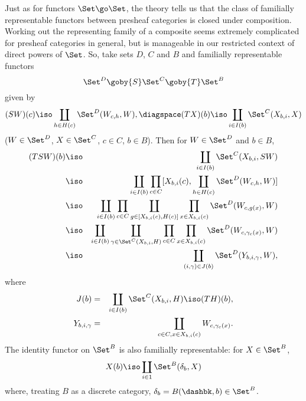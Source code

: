 Just as for functors $\Set \go \Set$, the theory tells us that the class of
familially representable functors between presheaf categories is closed
under composition.  Working out the representing family of a composite
seems extremely complicated for presheaf categories in general, but is
manageable in our restricted context of direct powers of $\Set$.  So, take
sets $D$, $C$ and $B$ and familially representable functors
\[
\Set^D \goby{S} \Set^C \goby{T} \Set^B
\]
given by
\[
(SW)(c) \iso \coprod_{h\in H(c)} \Set^D (W_{c,h}, W),
\diagspace
(TX)(b) \iso \coprod_{i\in I(b)} \Set^C (X_{b,i}, X)
\]
($W\in \Set^D$, $X\in \Set^C$, $c\in C$, $b\in B$).  Then for $W\in \Set^D$
and $b\in B$,
%
\begin{eqnarray*}
(TSW)(b)	&\iso	&
\coprod_{i\in I(b)} \Set^C (X_{b,i}, SW)			\\
	&\iso	&
\coprod_{i\in I(b)} \prod_{c\in C} 
[X_{b,i}(c), \coprod_{h\in H(c)} \Set^D (W_{c,h}, W)]		\\
	&\iso	&
\coprod_{i\in I(b)} \prod_{c\in C} 
\coprod_{g\in [X_{b,i}(c), H(c)]} \prod_{x\in X_{b,i}(c)}
\Set^D (W_{c, g(x)}, W)						\\
	&\iso	&
\coprod_{i\in I(b)} \coprod_{\gamma\in \Set^C(X_{b,i}, H)} 
\prod_{c\in C} \prod_{x\in X_{b,i}(c)}
\Set^D (W_{c, \gamma_c(x)}, W)						\\
	&\iso	&
\coprod_{(i,\gamma)\in J(b)} \Set^D (Y_{b,i,\gamma}, W),
\end{eqnarray*}
%
where 
%
\begin{eqnarray*}
J(b)		&=	&
\coprod_{i\in I(b)} \Set^C (X_{b,i}, H) \iso (TH)(b),	\\
Y_{b,i,\gamma}	&=	&
\coprod_{c\in C, x\in X_{b,i}(c)} W_{c,\gamma_c(x)}.
\end{eqnarray*}
%
The identity functor on $\Set^B$ is also familially representable: for
$X\in \Set^B$, 
\[
X(b) \iso \coprod_{i\in 1} \Set^B (\delta_b, X)
\]
where, treating $B$ as a discrete category, $\delta_b = B(\dashbk,b) \in
\Set^B$.

